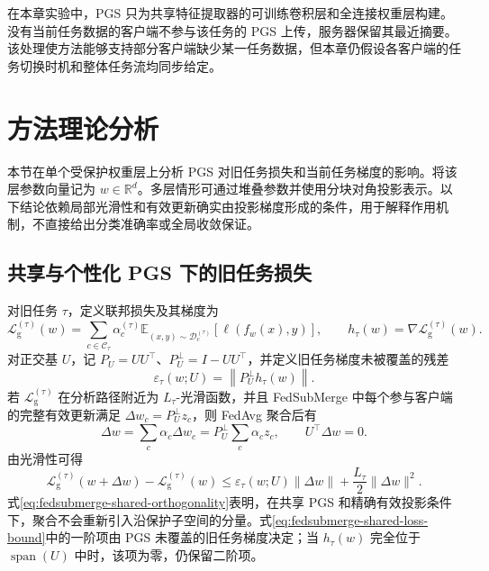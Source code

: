在本章实验中，PGS 只为共享特征提取器的可训练卷积层和全连接权重层构建。没有当前任务数据的客户端不参与该任务的 PGS 上传，服务器保留其最近摘要。该处理使方法能够支持部分客户端缺少某一任务数据，但本章仍假设各客户端的任务切换时机和整体任务流均同步给定。

\section{方法理论分析}
\label{sec:fedsubmerge-theory}

本节在单个受保护权重层上分析 PGS 对旧任务损失和当前任务梯度的影响。将该层参数向量记为 $w\in\mathbb{R}^{d}$。多层情形可通过堆叠参数并使用分块对角投影表示。以下结论依赖局部光滑性和有效更新确实由投影梯度形成的条件，用于解释作用机制，不直接给出分类准确率或全局收敛保证。

\subsection{共享与个性化 PGS 下的旧任务损失}
\label{subsec:fedsubmerge-theory-loss}

对旧任务 $\tau$，定义联邦损失及其梯度为
\begin{equation}
\mathcal{L}_{\mathrm g}^{(\tau)}(w)
=
\sum_{c\in\mathcal{C}_{\tau}}
\alpha_c^{(\tau)}
\mathbb{E}_{(x,y)\sim\mathcal{D}_c^{(\tau)}}
\left[\ell(f_w(x),y)\right],
\qquad
h_{\tau}(w)=\nabla\mathcal{L}_{\mathrm g}^{(\tau)}(w).
\label{eq:fedsubmerge-old-task-loss}
\end{equation}
对正交基 $U$，记 $P_U=UU^{\top}$、$P_U^{\perp}=I-UU^{\top}$，并定义旧任务梯度未被覆盖的残差
\begin{equation}
\varepsilon_{\tau}(w;U)
=
\left\|P_U^{\perp}h_{\tau}(w)\right\|.
\label{eq:fedsubmerge-coverage-residual}
\end{equation}
若 $\mathcal{L}_{\mathrm g}^{(\tau)}$ 在分析路径附近为 $L_{\tau}$-光滑函数，并且 FedSubMerge 中每个参与客户端的完整有效更新满足
$\Delta w_c=P_U^{\perp}z_c$，则 FedAvg 聚合后有
\begin{equation}
\Delta w
=
\sum_c\alpha_c\Delta w_c
=
P_U^{\perp}\sum_c\alpha_c z_c,
\qquad
U^{\top}\Delta w=0.
\label{eq:fedsubmerge-shared-orthogonality}
\end{equation}
由光滑性可得
\begin{equation}
\mathcal{L}_{\mathrm g}^{(\tau)}(w+\Delta w)
-
\mathcal{L}_{\mathrm g}^{(\tau)}(w)
\leq
\varepsilon_{\tau}(w;U)\|\Delta w\|
+
\frac{L_{\tau}}{2}\|\Delta w\|^2.
\label{eq:fedsubmerge-shared-loss-bound}
\end{equation}
式\eqref{eq:fedsubmerge-shared-orthogonality}表明，在共享 PGS 和精确有效投影条件下，聚合不会重新引入沿保护子空间的分量。式\eqref{eq:fedsubmerge-shared-loss-bound}中的一阶项由 PGS 未覆盖的旧任务梯度决定；当 $h_{\tau}(w)$ 完全位于 $\operatorname{span}(U)$ 中时，该项为零，仍保留二阶项。

